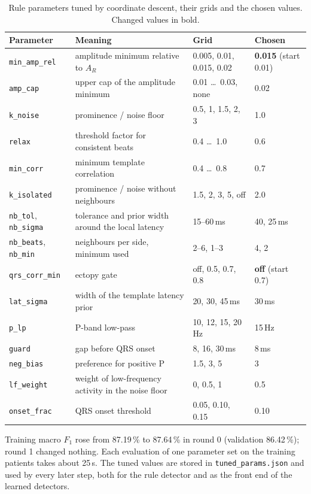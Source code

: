\documentclass[11pt,a4paper]{article}
\newcommand{\code}[1]{\texttt{#1}}
\begin{document}
\begin{table}[ht]
\centering
\caption{Rule parameters tuned by coordinate descent, their grids and the chosen values. Changed values in bold.}
\label{tab:grid}
\small
\begin{tabularx}{\linewidth}{lLll}
\toprule
Parameter & Meaning & Grid & Chosen \\
\midrule
\code{min\_amp\_rel} & amplitude minimum relative to $A_R$ & 0.005, 0.01, 0.015, 0.02 & \textbf{0.015} (start 0.01) \\
\code{amp\_cap} & upper cap of the amplitude minimum & 0.01 \ldots\ 0.03, none & 0.02 \\
\code{k\_noise} & prominence / noise floor & 0.5, 1, 1.5, 2, 3 & 1.0 \\
\code{relax} & threshold factor for consistent beats & 0.4 \ldots\ 1.0 & 0.6 \\
\code{min\_corr} & minimum template correlation & 0.4 \ldots\ 0.8 & 0.7 \\
\code{k\_isolated} & prominence / noise without neighbours & 1.5, 2, 3, 5, off & 2.0 \\
\code{nb\_tol}, \code{nb\_sigma} & tolerance and prior width around the local latency & 15--60\,ms & 40, 25\,ms \\
\code{nb\_beats}, \code{nb\_min} & neighbours per side, minimum used & 2--6, 1--3 & 4, 2 \\
\code{qrs\_corr\_min} & ectopy gate & off, 0.5, 0.7, 0.8 & \textbf{off} (start 0.7) \\
\code{lat\_sigma} & width of the template latency prior & 20, 30, 45\,ms & 30\,ms \\
\code{p\_lp} & P-band low-pass & 10, 12, 15, 20\,Hz & 15\,Hz \\
\code{guard} & gap before QRS onset & 8, 16, 30\,ms & 8\,ms \\
\code{neg\_bias} & preference for positive P & 1.5, 3, 5 & 3 \\
\code{lf\_weight} & weight of low-frequency activity in the noise floor & 0, 0.5, 1 & 0.5 \\
\code{onset\_frac} & QRS onset threshold & 0.05, 0.10, 0.15 & 0.10 \\
\bottomrule
\end{tabularx}
\end{table}

Training macro $F_1$ rose from 87.19\,\% to 87.64\,\% in round 0 (validation 86.42\,\%); round 1 changed nothing. Each evaluation of one parameter set on the training patients takes about 25\,s. The tuned values are stored in \code{tuned\_params.json} and used by every later step, both for the rule detector and as the front end of the learned detectors.
\end{document}
